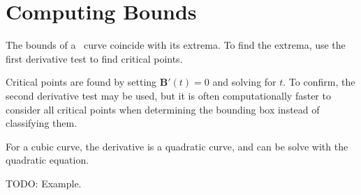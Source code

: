 \documentclass[oneside,usepdftitle=true]{article}
\begin{document}
\section{Computing Bounds}

The bounds of a \Bezier\ curve coincide with its extrema.  To find the extrema, use the first derivative test to find critical points.

Critical points are found by setting $\mathbf{B}'(t) = 0$ and solving for $t$.  To confirm, the second derivative test may be used, but it is often computationally faster to consider all critical points when determining the bounding box instead of classifying them.

For a cubic curve, the derivative is a quadratic curve, and can be solve with the quadratic equation.

TODO: Example.

\newpage
\nocite{cs-lecture,bez-paper} %



\end{document}
